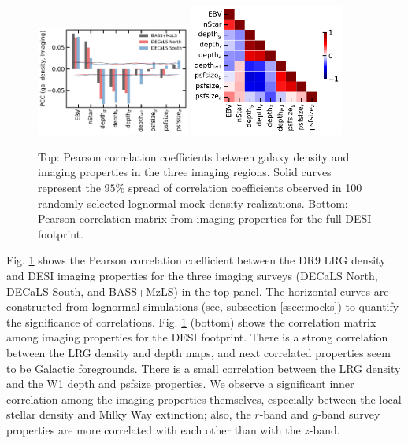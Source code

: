 \begin{figure}
 \includegraphics[width=0.45\textwidth]{figures/pcc.pdf} 
 \includegraphics[width=0.45\textwidth]{figures/pccx.pdf}  
 \caption{Top: Pearson correlation coefficients between galaxy density and imaging properties in the three imaging regions. Solid curves represent the $95\%$ spread of correlation coefficients observed in 100 randomly selected lognormal mock density realizations. Bottom: Pearson correlation matrix from imaging properties for the full DESI footprint.}
 \label{fig:pcc}
\end{figure}



Fig. \ref{fig:pcc} shows the Pearson correlation coefficient between the DR9 LRG density and DESI imaging properties for the three imaging surveys (DECaLS North, DECaLS South, and BASS+MzLS) in the top panel. The horizontal curves are constructed from lognormal simulations (see, subsection \ref{ssec:mocks}) to quantify the significance of correlations. Fig. \ref{fig:pcc} (bottom) shows the correlation matrix among imaging properties for the DESI footprint. There is a strong correlation between the LRG density and depth maps, and next correlated properties seem to be Galactic foregrounds. There is a small correlation between the LRG density and the W1 depth and psfsize properties. We observe a significant inner correlation among the imaging properties themselves, especially between the local stellar density and Milky Way extinction; also, the $r$-band and $g$-band survey properties are more correlated with each other than with the $z$-band. 

